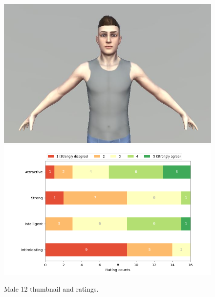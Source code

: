 \begin{figure}[H]
  \includegraphics[width=\linewidth]{Images/Males/12.JPG}
\endminipage\hfill
{}
  \includegraphics[width=\linewidth]{Survey/MRatings/avatar_m12.png}
\endminipage\hfill
\caption{Male 12 thumbnail and ratings.}
\end{figure}


